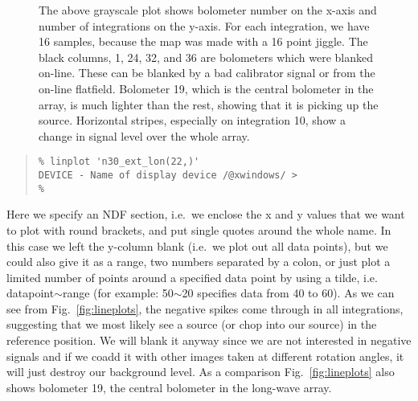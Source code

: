 \documentclass[twoside,11pt]{article}
\newenvironment{myquote}{\begin{quote}\begin{small}}{\end{small}\end{quote}}
\newcommand{\task}[1]{\textsf{#1}}
\newcommand{\rotate}{\xref{\task{rotate}}{sun95}{ROTATE}}
\newcommand{\xref}[3]{#1}
\begin{document}
%
\begin{figure}
\begin{center}
\caption{The above grayscale plot shows bolometer number
on the x-axis and number of integrations on the y-axis. For each
integration, we have 16 samples, because the map was made with a 16 point
jiggle. The black columns, 1, 24, 32, and 36 are bolometers which were
blanked on-line. These can be blanked by a bad calibrator signal or from
the on-line flatfield. Bolometer 19, which is the central bolometer in
the array, is much lighter than the rest, showing that it is picking up
the source.  Horizontal stripes, especially on integration 10, show a
change in signal level over the whole array.
}
\label{fig:raw}
\end{center}
\end{figure}


\begin{myquote} \begin{verbatim}
% linplot 'n30_ext_lon(22,)'
DEVICE - Name of display device /@xwindows/ >
% 
\end{verbatim} \end{myquote}



Here we specify an \xref{NDF section}{sun33}{ndf_sections}, i.e.\ we enclose
the x and y values that we want to plot with round brackets, and put single
quotes around the whole name. In this case we left the y-column blank (i.e.\
we plot out all data points), but we could also give it as a range, two
numbers separated by a colon, or just plot a limited number of points around a
specified data point by using a tilde, i.e. datapoint$\sim$range (for example:
50$\sim$20 specifies data from 40 to 60). As we can see from Fig.\
\ref{fig:lineplots}, the negative spikes come through in all integrations,
suggesting that we most likely see a source (or chop into our source) in the
reference position. We will blank it anyway since we are not interested
in negative signals and if we coadd it with other images taken at different
rotation angles, it will just destroy our background level.  As a comparison
Fig.\ \ref{fig:lineplots} also shows bolometer 19, the central bolometer in
the long-wave array.
\end{document}
